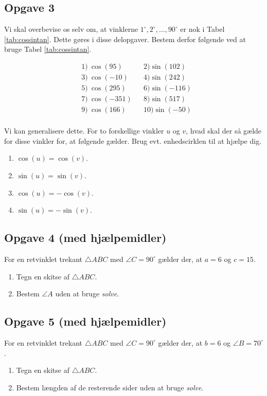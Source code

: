 \subsection*{Opgave 3}

Vi skal overbevise os selv om, at vinklerne $1^\circ, 2^\circ, \hdots, 90^\circ$ er nok i Tabel \ref{tab:cossintan}. Dette gøres i disse delopgaver. Bestem derfor følgende ved at bruge Tabel \ref{tab:cossintan}.

\begin{align*}
	&1) \ \cos(95)   &  &2) \sin(102) \\
	&3) \ \cos(-10)  &  &4) \sin(242) \\
	&5) \ \cos(295)  &  &6) \sin(-116) \\
	&7) \ \cos(-351)  &  &8) \sin(517) \\
	&9) \ \cos(166)  &  &10) \sin(-50) \\	
\end{align*}

Vi kan generalisere dette. For to forskellige vinkler $u$ og $v$, hvad skal der så gælde for disse vinkler for, at følgende gælder. Brug evt. enhedscirklen til at hjælpe dig. 
\begin{enumerate}[label=\roman*)]
	\item $\cos(u) = \cos(v)$.
	\item $\sin(u) = \sin(v)$.
	\item $\cos(u) = -\cos(v)$.
	\item $\sin(u) = -\sin(v)$.
\end{enumerate}

\subsection*{Opgave 4 (med hjælpemidler)}

For en retvinklet trekant $\triangle ABC$ med $\angle C = 90^\circ$ gælder der, at $a = 6$ og $c = 15$.
\begin{enumerate}[label=\roman*)	]
	\item Tegn en skitse af $\triangle ABC$. 
	\item Bestem $\angle A$ uden at bruge \textit{solve}.
\end{enumerate}

\subsection*{Opgave 5 (med hjælpemidler)}

For en retvinklet trekant $\triangle ABC$ med $\angle C = 90^\circ$ gælder der, at $b = 6$ og $\angle B = 70^\circ$.
\begin{enumerate}[label=\roman*)	]
	\item Tegn en skitse af $\triangle ABC$. 
	\item Bestem længden af de resterende sider uden at bruge \textit{solve}.
\end{enumerate}

